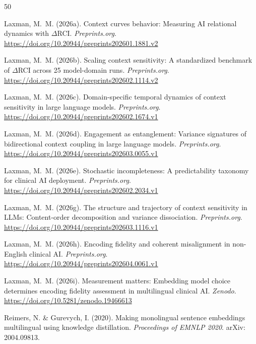 \documentclass[11pt,a4paper]{article}
\begin{document}
\begin{thebibliography}{50}

Laxman, M.~M. (2026a).
\newblock Context curves behavior: Measuring {AI} relational dynamics with {$\Delta$RCI}.
\newblock \emph{Preprints.org}.
\newblock \url{https://doi.org/10.20944/preprints202601.1881.v2}

Laxman, M.~M. (2026b).
\newblock Scaling context sensitivity: A standardized benchmark of {$\Delta$RCI} across
25 model-domain runs.
\newblock \emph{Preprints.org}.
\newblock \url{https://doi.org/10.20944/preprints202602.1114.v2}

Laxman, M.~M. (2026c).
\newblock Domain-specific temporal dynamics of context sensitivity in large language
models.
\newblock \emph{Preprints.org}.
\newblock \url{https://doi.org/10.20944/preprints202602.1674.v1}

Laxman, M.~M. (2026d).
\newblock Engagement as entanglement: Variance signatures of bidirectional context
coupling in large language models.
\newblock \emph{Preprints.org}.
\newblock \url{https://doi.org/10.20944/preprints202603.0055.v1}

Laxman, M.~M. (2026e).
\newblock Stochastic incompleteness: A predictability taxonomy for clinical {AI}
deployment.
\newblock \emph{Preprints.org}.
\newblock \url{https://doi.org/10.20944/preprints202602.2034.v1}

Laxman, M.~M. (2026g).
\newblock The structure and trajectory of context sensitivity in {LLMs}: Content-order
decomposition and variance dissociation.
\newblock \emph{Preprints.org}.
\newblock \url{https://doi.org/10.20944/preprints202603.1116.v1}

Laxman, M.~M. (2026h).
\newblock Encoding fidelity and coherent misalignment in non-{E}nglish clinical {AI}.
\newblock \emph{Preprints.org}.
\newblock \url{https://doi.org/10.20944/preprints202604.0061.v1}

Laxman, M.~M. (2026i).
\newblock Measurement matters: Embedding model choice determines encoding fidelity
assessment in multilingual clinical {AI}.
\newblock \emph{Zenodo}.
\newblock \url{https://doi.org/10.5281/zenodo.19466613}

Reimers, N. \& Gurevych, I. (2020).
\newblock Making monolingual sentence embeddings multilingual using knowledge distillation.
\newblock \emph{Proceedings of EMNLP 2020}.
\newblock arXiv: 2004.09813.


\end{thebibliography}
\end{document}

